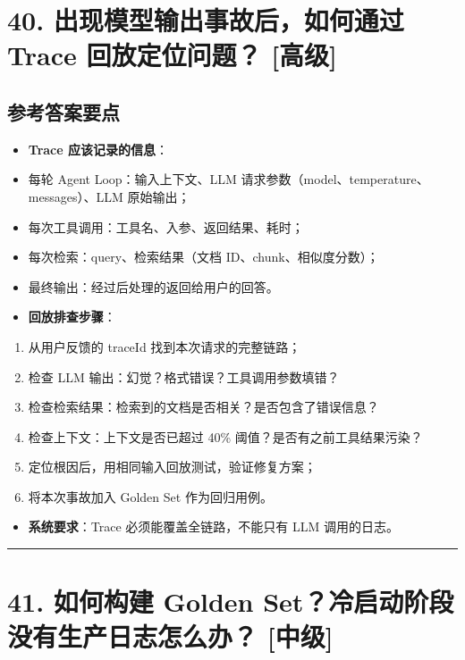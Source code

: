 \documentclass[9pt,a4paper,twocolumn]{ctexart}
\newcommand{\lvzhong}{\usebox{\badgezhongbox}}
\newcommand{\lvgao}{\usebox{\badgegaobox}}
\def\lvzhong{[中级]}%
\def\lvgao{[高级]}%
\begin{document}
\section*{40. 出现模型输出事故后，如何通过 Trace 回放定位问题？ \lvgao{}}


\subsection*{参考答案要点}

\begin{itemize}[itemsep=1pt, topsep=2pt]
  \item \textbf{Trace 应该记录的信息}：
  \item 每轮 Agent Loop：输入上下文、LLM 请求参数（model、temperature、messages）、LLM 原始输出；
  \item 每次工具调用：工具名、入参、返回结果、耗时；
  \item 每次检索：query、检索结果（文档 ID、chunk、相似度分数）；
  \item 最终输出：经过后处理的返回给用户的回答。
  \item \textbf{回放排查步骤}：
\end{itemize}
\begin{enumerate}[itemsep=1pt, topsep=2pt]
  \item 从用户反馈的 traceId 找到本次请求的完整链路；
  \item 检查 LLM 输出：幻觉？格式错误？工具调用参数填错？
  \item 检查检索结果：检索到的文档是否相关？是否包含了错误信息？
  \item 检查上下文：上下文是否已超过 40\% 阈值？是否有之前工具结果污染？
  \item 定位根因后，用相同输入回放测试，验证修复方案；
  \item 将本次事故加入 Golden Set 作为回归用例。
\end{enumerate}
\begin{itemize}[itemsep=1pt, topsep=2pt]
  \item \textbf{系统要求}：Trace 必须能覆盖全链路，不能只有 LLM 调用的日志。
\end{itemize}


\vspace{2pt}
\noindent\rule{\columnwidth}{0.3pt}\vspace{2pt}



\section*{41. 如何构建 Golden Set？冷启动阶段没有生产日志怎么办？ \lvzhong{}}
\end{document}
